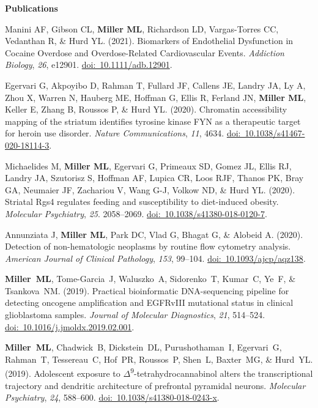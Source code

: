 \documentclass[10pt]{article}
\begin{document}
\vspace{0.1in}
{\large \textbf{Publications}}

\begin{description}
\item Manini AF, Gibson CL, \textbf{Miller ML}, Richardson LD, Vargas-Torres CC, Vedanthan R, \& Hurd YL. (2021). Biomarkers of Endothelial Dysfunction in Cocaine Overdose and Overdose-Related Cardiovascular Events. \textit{Addiction Biology}, \textit{26}, e12901. \href{https://doi.org/10.1111/adb.12901}{doi:~10.1111/adb.12901}.
\item Egervari G, Akpoyibo D, Rahman T, Fullard JF, Callens JE, Landry JA, Ly A, Zhou X, Warren N, Hauberg ME, Hoffman G, Ellis R, Ferland JN, \textbf{Miller ML}, Keller E, Zhang B, Roussos P, \& Hurd YL. (2020). Chromatin accessibility mapping of the striatum identifies tyrosine kinase FYN as a therapeutic target for heroin use disorder. \textit{Nature Communications}, \textit{11}, 4634. \href{https://doi.org/10.1038/s41467-020-18114-3}{doi:~10.1038/s41467-020-18114-3}.
\item Michaelides M, \textbf{Miller ML}, Egervari G, Primeaux SD, Gomez JL, Ellis RJ, Landry JA, Szutorisz S, Hoffman AF, Lupica CR, Loos RJF, Thanos PK, Bray GA, Neumaier JF, Zachariou V, Wang G-J, Volkow ND, \& Hurd YL. (2020). Striatal Rgs4 regulates feeding and susceptibility to diet-induced obesity. \textit{Molecular Psychiatry}, \textit{25}. 2058--2069. \href{https://doi.org/10.1038/s41380-018-0120-7}{doi:~10.1038/s41380-018-0120-7}.
\item Annunziata J, \textbf{Miller ML}, Park DC, Vlad G, Bhagat G, \& Alobeid A. (2020). Detection of non-hematologic neoplasms by routine flow cytometry analysis. \textit{American Journal of Clinical Pathology}, \textit{153}, 99--104. \href{https://doi.org/10.1093/ajcp/aqz138}{doi:~10.1093/ajcp/aqz138}.
\item \textbf{Miller~ML}, Tome-Garcia~J, Waluszko~A, Sidorenko~T, Kumar~C, Ye~F, \& Tsankova~NM. (2019). Practical bioinformatic DNA-sequencing pipeline for detecting oncogene amplification and EGFRvIII mutational status in clinical glioblastoma samples. \textit{Journal of Molecular Diagnostics}, \textit{21}, 514--524. \href{https://doi.org/10.1016/j.jmoldx.2019.02.001}{doi:~10.1016/j.jmoldx.2019.02.001}.
\item \textbf{Miller~ML}, Chadwick~B, Dickstein~DL, Purushothaman~I, Egervari~G, Rahman~T, Tessereau~C, Hof~PR, Roussos~P, Shen~L, Baxter~MG, \& Hurd~YL. (2019). Adolescent exposure to $\Delta$\textsuperscript{9}-tetrahydrocannabinol alters the transcriptional trajectory and dendritic architecture of prefrontal pyramidal neurons. \textit{Molecular Psychiatry}, \textit{24}, 588--600. \href{https://doi.org/10.1038/s41380-018-0243-x}{doi:~10.1038/s41380-018-0243-x}.

\end{description}
\end{document}
